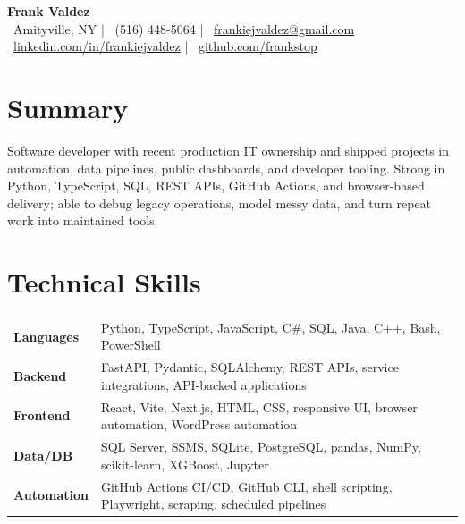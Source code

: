 \documentclass[10pt,letterpaper]{article}
\begin{document}
\fontsize{9.25}{11.05}\selectfont

\begin{center}
  {\Large \textbf{Frank Valdez}}\\[1.5pt]
  \faMapMarker*~Amityville, NY \quad | \quad \faPhone*~(516) 448-5064 \quad | \quad \faEnvelope~\href{mailto:frankiejvaldez@gmail.com}{frankiejvaldez@gmail.com}\\[1pt]
  \faLinkedin~\href{https://linkedin.com/in/frankiejvaldez}{linkedin.com/in/frankiejvaldez} \quad | \quad \faGithub~\href{https://github.com/frankstop}{github.com/frankstop}
\end{center}

\section*{Summary}
Software developer with recent production IT ownership and shipped projects in automation, data pipelines, public dashboards, and developer tooling. Strong in Python, TypeScript, SQL, REST APIs, GitHub Actions, and browser-based delivery; able to debug legacy operations, model messy data, and turn repeat work into maintained tools.

\section*{Technical Skills}
\begin{tabularx}{\textwidth}{@{}>{\bfseries}p{1.15in} >{\raggedright\arraybackslash}X@{}}
Languages & Python, TypeScript, JavaScript, C\#, SQL, Java, C++, Bash, PowerShell\\
Backend & FastAPI, Pydantic, SQLAlchemy, REST APIs, service integrations, API-backed applications\\
Frontend & React, Vite, Next.js, HTML, CSS, responsive UI, browser automation, WordPress automation\\
Data/DB & SQL Server, SSMS, SQLite, PostgreSQL, pandas, NumPy, scikit-learn, XGBoost, Jupyter\\
Automation & GitHub Actions CI/CD, GitHub CLI, shell scripting, Playwright, scraping, scheduled pipelines\\
\end{tabularx}
\end{document}
